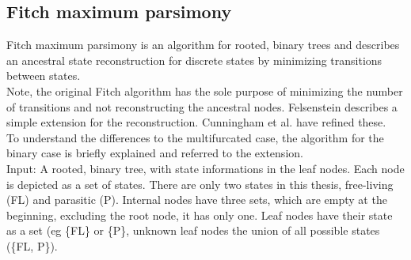     \subsection{Fitch maximum parsimony}
      Fitch maximum parsimony is an algorithm for rooted, binary trees and describes an ancestral state 
        reconstruction for discrete states \cite{Fitch1971} by minimizing transitions between states. \\
      Note, the original Fitch algorithm has the sole purpose of minimizing the number of transitions 
        and not reconstructing the ancestral nodes. Felsenstein \cite{Felsenstein2003} describes a 
        simple extension for the reconstruction. Cunningham et al. \cite{Cunningham1998} have refined 
        these.   \\
      To understand the differences to the multifurcated case, the algorithm for the binary case is 
        briefly explained and referred to the extension. \\

      Input: A rooted, binary tree, with state informations in the leaf nodes. Each node is depicted as 
        a set of states. There are only two states in this thesis, free-living (FL) and parasitic (P). 
        Internal nodes have three sets, which are empty at the beginning, excluding the root node, it 
        has only one. Leaf nodes have their state as a set (eg \{FL\} or \{P\}, unknown leaf nodes the 
        union of all possible states (\{FL, P\}). \\

